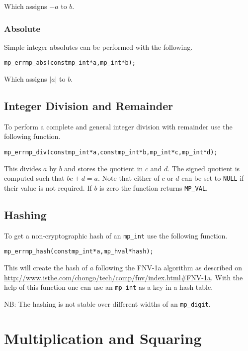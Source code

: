 \documentclass[synpaper]{book}
\begin{document}
Which assigns $-a$ to $b$.

\subsection{Absolute}
Simple integer absolutes can be performed with the following.

\begin{alltt}
mp_err mp_abs (const mp_int *a, mp_int *b);
\end{alltt}

Which assigns $\vert a \vert$ to $b$.

\section{Integer Division and Remainder}
To perform a complete and general integer division with remainder use the following function.

\begin{alltt}
mp_err mp_div (const mp_int *a, const mp_int *b, mp_int *c, mp_int *d);
\end{alltt}

This divides $a$ by $b$ and stores the quotient in $c$ and $d$.  The signed quotient is computed
such that $bc + d = a$.  Note that either of $c$ or $d$ can be set to \texttt{NULL} if their value
is not required.  If $b$ is zero the function returns \texttt{MP\_VAL}.

\section{Hashing}
To get a non-cryptographic hash of an \texttt{mp\_int} use the following function.

\begin{alltt}
mp_err mp_hash (const mp_int *a, mp_hval *hash);
\end{alltt}

This will create the hash of $a$ following the \mbox{FNV-1a} algorithm as described on
\url{http://www.isthe.com/chongo/tech/comp/fnv/index.html#FNV-1a}. With the
help of this function one can use an \texttt{mp\_int} as a key in a hash table.

NB: The hashing is not stable over different widths of an \texttt{mp\_digit}.

\chapter{Multiplication and Squaring}
\end{document}
